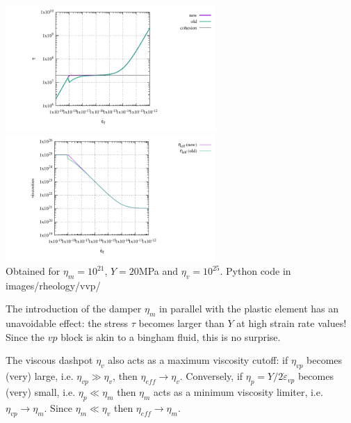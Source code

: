 \begin{itemize}
\begin{center}
\includegraphics[width=8cm]{images/rheology/vvp/tau_comp.pdf}
\includegraphics[width=8cm]{images/rheology/vvp/viscosities_comp.pdf}\\
{\captionfont Obtained for $\eta_m=10^{21}$, $Y=20$MPa and $\eta_v=10^{25}$. Python code 
in images/rheology/vvp/}
\end{center}

\begin{remark}
The introduction of the damper $\eta_m$ in parallel with the plastic element has an unavoidable
effect: the stress $\tau$ becomes larger than $Y$ at high strain rate values! Since the $vp$ 
block is akin to a bingham fluid, this is no surprise.
\end{remark}

\begin{remark}
The viscous dashpot $\eta_v$ also acts as a maximum viscosity cutoff: if $\eta_{vp}$ becomes (very) large, i.e. $\eta_{vp} \gg \eta_v$, then $\eta_{eff} \rightarrow \eta_v$.
Conversely, if $\eta_p=Y/2\dot\varepsilon_{vp}$ becomes (very) small, i.e. $\eta_p \ll \eta_m$ then $\eta_m$ acts as a minimum viscosity limiter, i.e. $\eta_{vp} \rightarrow \eta_m$. 
Since $\eta_m \ll \eta_v$ then $\eta_{eff} \rightarrow \eta_m$.
\end{remark}


%




\end{itemize}
